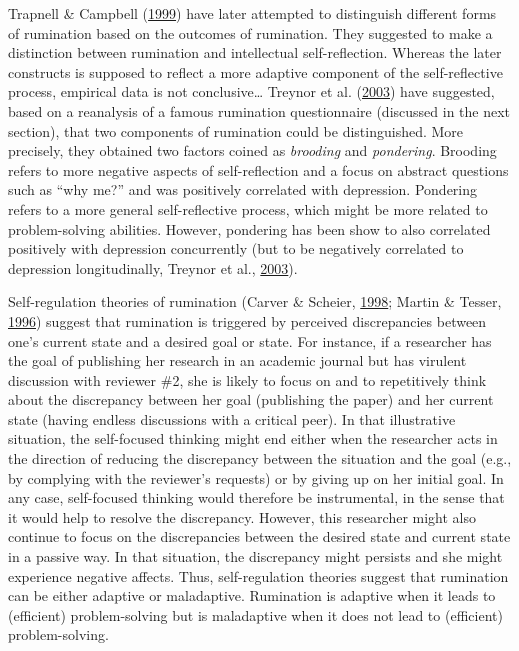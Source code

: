 \documentclass[a4paper,12pt,twoside,openright,oldfontcommands]{memoir}
\begin{document}
Trapnell \& Campbell (\protect\hyperlink{ref-trapnell_private_1999}{1999}) have later attempted to distinguish different forms of rumination based on the outcomes of rumination. They suggested to make a distinction between rumination and intellectual self-reflection. Whereas the later constructs is supposed to reflect a more adaptive component of the self-reflective process, empirical data is not conclusive\ldots{} Treynor et al. (\protect\hyperlink{ref-treynor_rumination_2003}{2003}) have suggested, based on a reanalysis of a famous rumination questionnaire (discussed in the next section), that two components of rumination could be distinguished. More precisely, they obtained two factors coined as \emph{brooding} and \emph{pondering}. Brooding refers to more negative aspects of self-reflection and a focus on abstract questions such as \enquote{why me?} and was positively correlated with depression. Pondering refers to a more general self-reflective process, which might be more related to problem-solving abilities. However, pondering has been show to also correlated positively with depression concurrently (but to be negatively correlated to depression longitudinally, Treynor et al., \protect\hyperlink{ref-treynor_rumination_2003}{2003}).

Self-regulation theories of rumination (Carver \& Scheier, \protect\hyperlink{ref-carver_self-regulation_1998}{1998}; Martin \& Tesser, \protect\hyperlink{ref-Martin}{1996}) suggest that rumination is triggered by perceived discrepancies between one's current state and a desired goal or state. For instance, if a researcher has the goal of publishing her research in an academic journal but has virulent discussion with reviewer \#2, she is likely to focus on and to repetitively think about the discrepancy between her goal (publishing the paper) and her current state (having endless discussions with a critical peer). In that illustrative situation, the self-focused thinking might end either when the researcher acts in the direction of reducing the discrepancy between the situation and the goal (e.g., by complying with the reviewer's requests) or by giving up on her initial goal. In any case, self-focused thinking would therefore be instrumental, in the sense that it would help to resolve the discrepancy. However, this researcher might also continue to focus on the discrepancies between the desired state and current state in a passive way. In that situation, the discrepancy might persists and she might experience negative affects. Thus, self-regulation theories suggest that rumination can be either adaptive or maladaptive. Rumination is adaptive when it leads to (efficient) problem-solving but is maladaptive when it does not lead to (efficient) problem-solving.
\end{document}
